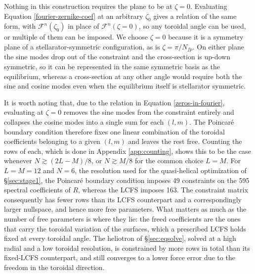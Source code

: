 \documentclass{jpp}
\begin{document}
Nothing in this construction requires the plane to be at $\zeta=0$. Evaluating Equation \ref{fourier-zernike-coef} at an arbitrary $\zeta_0$ gives a relation of the same form, with $\mathcal{F}^n(\zeta_0)$ in place of $\mathcal{F}^n(\zeta=0)$, so any toroidal angle can be used, or multiple of them can be imposed. We choose $\zeta=0$ because it is a symmetry plane of a stellarator-symmetric configuration, as is $\zeta=\pi/N_{fp}$. On either plane the sine modes drop out of the constraint and the cross-section is up-down symmetric, so it can be represented in the same symmetric basis as the equilibrium, whereas a cross-section at any other angle would require both the sine and cosine modes even when the equilibrium itself is stellarator symmetric.

It is worth noting that, due to the relation in Equation \ref{zeros-in-fourier}, evaluating at $\zeta=0$ removes the sine modes from the constraint entirely and collapses the cosine modes into a single sum for each $(l,m)$. The Poincaré boundary condition therefore fixes one linear combination of the toroidal coefficients belonging to a given $(l,m)$ and leaves the rest free. Counting the rows of each, which is done in Appendix \ref{app:counting}, shows this to be the case whenever $N \gtrsim (2L-M)/8$, or $N \gtrsim M/8$ for the common choice $L=M$. For $L=M=12$ and $N=6$, the resolution used for the quasi-helical optimization of \S\ref{sec:stage1}, the Poincaré boundary condition imposes 49 constraints on the 595 spectral coefficients of $R$, whereas the LCFS imposes 163. The constraint matrix consequently has fewer rows than its LCFS counterpart and a correspondingly larger nullspace, and hence more free parameters. What matters as much as the number of free parameters is where they lie: the freed coefficients are the ones that carry the toroidal variation of the surfaces, which a prescribed LCFS holds fixed at every toroidal angle. The heliotron of \S\ref{sec:eqsolve}, solved at a high radial and a low toroidal resolution, is constrained by more rows in total than its fixed-LCFS counterpart, and still converges to a lower force error due to the freedom in the toroidal direction.

\end{document}
